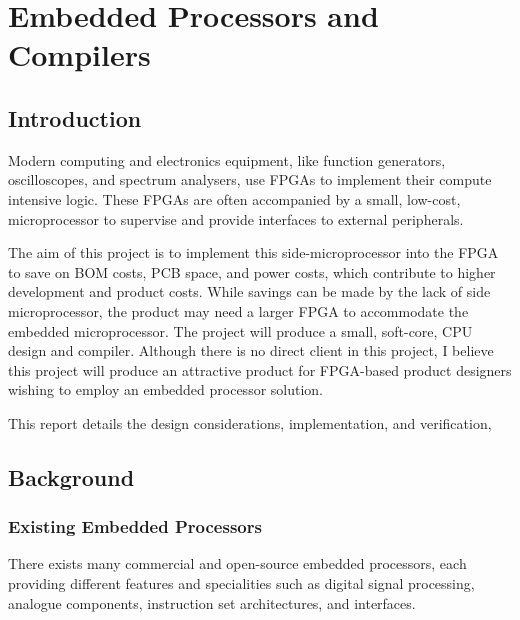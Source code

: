 \documentclass[11pt,a4paper]{report}
\begin{document}
\newpage
\chapter{Embedded Processors and Compilers}
{\hypersetup{linkcolor=black}
\startcontents[chapters]
}

\section{Introduction}
Modern computing and electronics equipment, like function generators, oscilloscopes, and spectrum analysers, use FPGAs to implement their compute intensive logic. These FPGAs are often accompanied by a small, low-cost, microprocessor to supervise and provide interfaces to external peripherals.

The aim of this project is to implement this side-microprocessor into the FPGA to save on BOM costs, PCB  space,  and  power  costs,  which  contribute  to  higher  development  and  product  costs.  While  savings can  be  made  by  the  lack  of  side  microprocessor,  the  product  may  need  a  larger  FPGA  to  accommodate the embedded microprocessor.  The project will produce a small, soft-core, CPU design and compiler. Although there is no direct client in this project, I believe this project will produce an attractive product
for FPGA-based product designers wishing to employ an embedded processor solution.

This report details the design considerations, implementation, and verification, 

\section{Background}
\subsection{Existing Embedded Processors}
\label{current_impl}
There exists many commercial and open-source embedded processors, each providing different features and specialities such as digital signal processing, analogue components, instruction set architectures, and interfaces.
\end{document}
